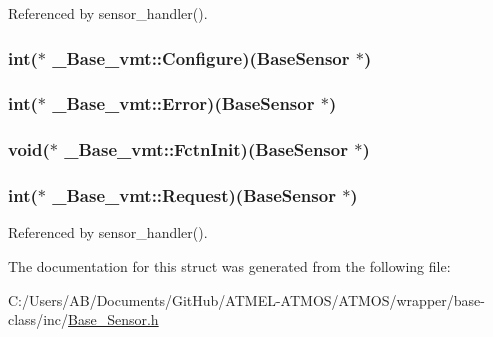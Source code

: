 Referenced by sensor\-\_\-handler().

\hypertarget{struct___base__vmt_a4679051b7c8d66b3f4546c5e7c3d1457}{
\subsubsection[{Configure}]{\setlength{\rightskip}{0pt plus 5cm}int($\ast$ \-\_\-\-Base\-\_\-vmt\-::\-Configure)({\bf Base\-Sensor} $\ast$)}}\label{struct___base__vmt_a4679051b7c8d66b3f4546c5e7c3d1457}
\hypertarget{struct___base__vmt_a64d04ad91e33e5f4636187057220cadd}{
\subsubsection[{Error}]{\setlength{\rightskip}{0pt plus 5cm}int($\ast$ \-\_\-\-Base\-\_\-vmt\-::\-Error)({\bf Base\-Sensor} $\ast$)}}\label{struct___base__vmt_a64d04ad91e33e5f4636187057220cadd}
\hypertarget{struct___base__vmt_ab21211ac2888f2e9c15ea3f7bdfe3e82}{
\subsubsection[{Fctn\-Init}]{\setlength{\rightskip}{0pt plus 5cm}void($\ast$ \-\_\-\-Base\-\_\-vmt\-::\-Fctn\-Init)({\bf Base\-Sensor} $\ast$)}}\label{struct___base__vmt_ab21211ac2888f2e9c15ea3f7bdfe3e82}
\hypertarget{struct___base__vmt_a082d37f332222c418394227f2de537f7}{
\subsubsection[{Request}]{\setlength{\rightskip}{0pt plus 5cm}int($\ast$ \-\_\-\-Base\-\_\-vmt\-::\-Request)({\bf Base\-Sensor} $\ast$)}}\label{struct___base__vmt_a082d37f332222c418394227f2de537f7}


Referenced by sensor\-\_\-handler().



The documentation for this struct was generated from the following file\-:\begin{DoxyCompactItemize}
\item 
C\-:/\-Users/\-A\-B/\-Documents/\-Git\-Hub/\-A\-T\-M\-E\-L-\/\-A\-T\-M\-O\-S/\-A\-T\-M\-O\-S/wrapper/base-\/class/inc/\hyperlink{_base___sensor_8h}{Base\-\_\-\-Sensor.\-h}\end{DoxyCompactItemize}
